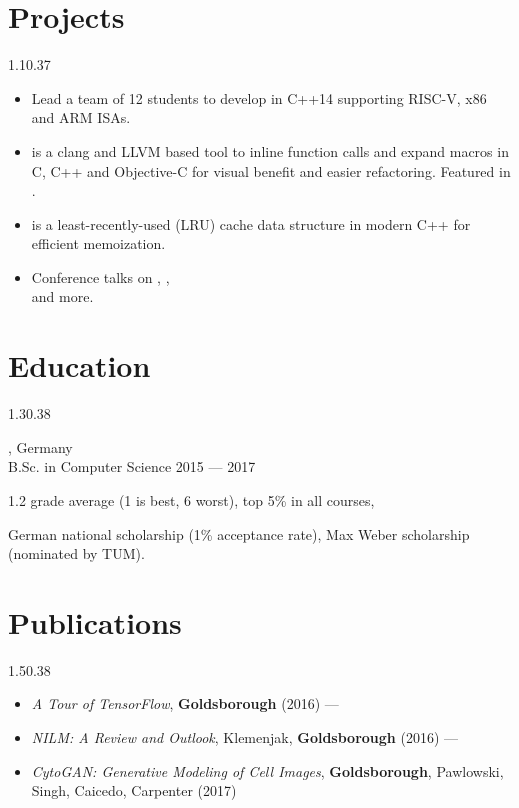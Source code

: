 \section{Projects}{1.1}{0.37}
\vspace{-4mm}
\begin{itemize}
  \item Lead a team of 12 students to develop  in C++14 supporting RISC-V, x86 and ARM ISAs.
  \item {} is a clang and LLVM based tool to inline function calls and expand macros in C, C++ and Objective-C for visual benefit and easier refactoring. Featured in .
  \item {} is a least-recently-used (LRU) cache data structure in modern C++ for efficient memoization.
  \item Conference talks on , ,\\  and more.
\end{itemize}

\section{Education}{1.3}{0.38}
\vspace{0.1cm}
\begin{entry}
	{, Germany}
	{\\B.Sc. in Computer Science}
	{2015 --- 2017}
  \item 1.2 grade average (1 is best, 6 worst), top 5\% in all courses,
  \item German national scholarship (1\% acceptance rate), Max Weber scholarship (nominated by TUM).
\end{entry}

\section{Publications}{1.5}{0.38}
\vspace{-4mm}
\begin{itemize}
  \item \emph{A Tour of TensorFlow}, \textbf{Goldsborough} (2016) --- 
  \item \emph{NILM: A Review and Outlook}, Klemenjak, \textbf{Goldsborough} (2016) --- 
  \item \emph{CytoGAN: Generative Modeling of Cell Images}, \textbf{Goldsborough}, Pawlowski, Singh, Caicedo, Carpenter (2017)
\end{itemize}


